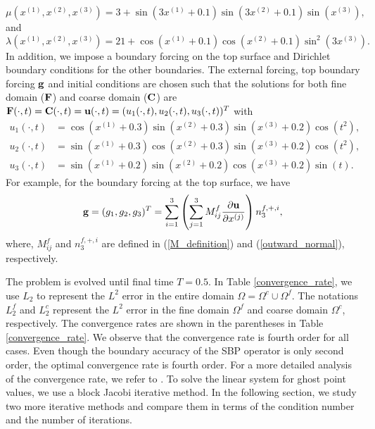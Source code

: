 \begin{equation*}\label{mu_function}
\mu(x^{(1)},x^{(2)},x^{(3)}) = 3 + \sin(3x^{(1)}+0.1)\sin(3x^{(2)}+0.1)\sin(x^{(3)}),
\end{equation*}
and 
\begin{equation*}\label{lambda_function}
\lambda(x^{(1)},x^{(2)},x^{(3)})  = 21+ \cos(x^{(1)}+0.1)\cos(x^{(2)}+0.1)\sin^2(3x^{(3)}).
\end{equation*}
 In addition, we impose a boundary forcing on the top surface and Dirichlet boundary conditions for the other boundaries. The external forcing, top boundary forcing ${\bf g}$ and initial conditions are chosen such that the solutions for both fine domain ($\bf F$) and coarse domain ($\bf C$) are ${\bf F}(\cdot,t) = {\bf C}(\cdot,t) = {\bf u}(\cdot,t) = (u_1(\cdot,t),u_2(\cdot,t),u_3(\cdot,t))^T$ with
\begin{align*}
u_1(\cdot,t) &= \cos(x^{(1)}+0.3)\sin(x^{(2)}+0.3)\sin(x^{(3)}+0.2)\cos(t^2),\\
u_2(\cdot,t) &= \sin(x^{(1)}+0.3)\cos(x^{(2)}+0.3)\sin(x^{(3)}+0.2)\cos(t^2),\\
u_3(\cdot,t) &= \sin(x^{(1)}+0.2)\sin(x^{(2)}+0.2)\cos(x^{(3)}+0.2)\sin(t).
\end{align*}
For example, for the boundary forcing at the top surface, we have 
\begin{equation*}\label{traction_force}
{\bf g} = (g_1,g_2,g_3)^T = \sum_{i=1}^3\left(\sum_{j = 1}^3 M_{ij}^f\frac{\partial{\bf u}}{\partial x^{(j)}}\right) n^{f,+,i}_3,
\end{equation*}
where, $M_{ij}^f$ and $n^{f,+,i}_3$ are defined in (\ref{M_definition}) and (\ref{outward_normal}), respectively.

The problem is evolved until final time $T = 0.5$. In Table \ref{convergence_rate}, we use $L_2$ to represent the $L^2$ error in the entire domain $\Omega = \Omega^c\cup\Omega^f$. The notations $L_2^f$ and $L_2^c$ represent the $L^2$ error in the fine domain $\Omega^f$ and  coarse domain $\Omega^c$, respectively. The convergence rates are shown in the parentheses in Table \ref{convergence_rate}. We observe that the convergence rate is fourth order for all cases. Even though the boundary accuracy of the SBP operator is only second order, the optimal convergence rate is fourth order. For a more detailed analysis of the convergence rate, we refer to \cite{Wang2017, Wang2018b}.  To solve the linear system for ghost point values, we use a block Jacobi iterative method. In the following section, we study two more iterative methods and compare them in terms of the condition number and the number of iterations.

